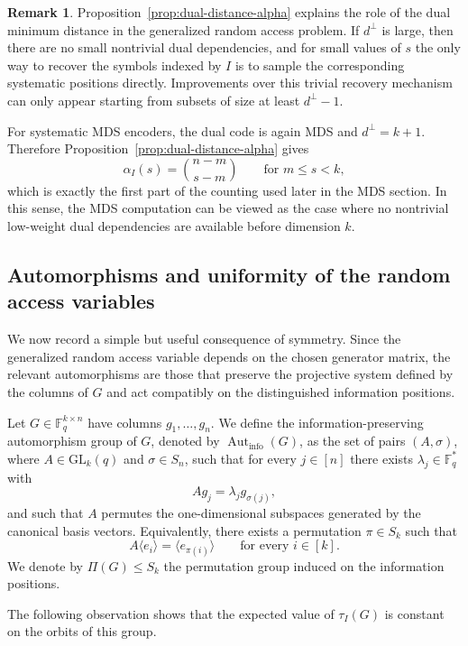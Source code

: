 \documentclass[11pt,a4paper]{article}
\numberwithin{equation}{section}
\theoremstyle{definition}
\newtheorem{remark}[definition]{Remark}
\theoremstyle{definition}
\newcommand{\F}{\mathbb{F}}
\newcommand{\Aut}{\operatorname{Aut}}
\begin{document}
\begin{remark}\label{rem:dual-mds}
Proposition~\ref{prop:dual-distance-alpha} explains the role of the dual
minimum distance in the generalized random access problem.  If $d^\perp$ is
large, then there are no small nontrivial dual dependencies, and for small
values of $s$ the only way to recover the symbols indexed by $I$ is to
sample the corresponding systematic positions directly.  Improvements over
this trivial recovery mechanism can only appear starting from subsets of size
at least $d^\perp-1$.

For systematic MDS encoders, the dual code is again MDS and $d^\perp=k+1$.
Therefore Proposition~\ref{prop:dual-distance-alpha} gives
\[
\alpha_I(s)=\binom{n-m}{s-m}
\qquad
\text{for }m\leq s<k,
\]
which is exactly the first part of the counting used later in the MDS section.
In this sense, the MDS computation can be viewed as the case where no
nontrivial low-weight dual dependencies are available before dimension $k$.
\end{remark}

\subsection{Automorphisms and uniformity of the random access variables}
\label{subsec:automorphisms}

We now record a simple but useful consequence of symmetry. Since the
generalized random access variable depends on the chosen generator matrix, the
relevant automorphisms are those that preserve the projective system defined by
the columns of $G$ and act compatibly on the distinguished information
positions.

Let $G\in \F_q^{k\times n}$ have columns $g_1,\ldots,g_n$. We define the
information-preserving automorphism group of $G$, denoted by
$\Aut_{\mathrm{info}}(G)$, as the set of pairs $(A,\sigma)$, where
$A\in \mathrm{GL}_k(q)$ and $\sigma\in S_n$, such that for every
$j\in[n]$ there exists $\lambda_j\in \F_q^\ast$ with
\[
A g_j=\lambda_j g_{\sigma(j)},
\]
and such that $A$ permutes the one-dimensional subspaces generated by the
canonical basis vectors. Equivalently, there exists a permutation
$\pi\in S_k$ such that
\[
A\langle e_i\rangle=\langle e_{\pi(i)}\rangle
\qquad\text{for every } i\in[k].
\]
We denote by $\Pi(G)\leq S_k$ the permutation group induced on the
information positions.

The following observation shows that the expected value of $\tau_I(G)$ is
constant on the orbits of this group.
\end{document}

